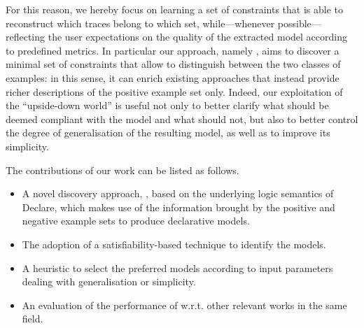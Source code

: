 
For this reason, we hereby focus on learning a set of constraints that is able to reconstruct which traces belong to which set, while---whenever possible---reflecting the user expectations on the quality of the extracted model according to predefined metrics. 
%
In particular our approach, namely \nd, aims to discover a minimal set of constraints that allow to distinguish between the two classes of examples: in this sense, it can enrich existing approaches that instead provide richer descriptions of the positive example set only. Indeed, our exploitation of the ``upside-down world'' is useful not only to better clarify what should be deemed compliant with the model and what should not, but also to better control the degree of generalisation of the resulting model, as well as to improve its simplicity.

%



The contributions of our work can be listed as follows.
\begin{itemize}
\item A novel discovery approach, \nd, based on the underlying logic semantics of Declare, which makes use of the information brought by the positive and negative example sets to produce declarative models.
\item The adoption of a satisfiability-based technique to identify the models.
\item A heuristic to select the preferred models according to input parameters dealing with generalisation or simplicity.
\item An evaluation of the performance of \nd w.r.t. other relevant works in the same field.
\end{itemize}


